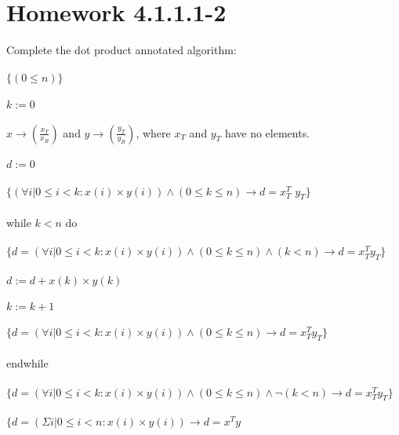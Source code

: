 \documentclass{article}
\begin{document}
\section{Homework 4.1.1.1-2}
Complete the dot product annotated algorithm:
\\
\\
$\lbrace (0 \leq n)\rbrace$
\\
\\
$k := 0$
\\
\\
$ x \rightarrow \left(\frac{x_{T}}{x_{B}}\right)$ and $y \rightarrow \left(\frac{y_{T}}{y_{B}}\right)$, where $x_{T}$ and $y_{T}$ have no elements.
\\
\\
$d := 0$
\\
\\
$\lbrace (\forall i | 0 \leq i < k : x(i) \times y(i)) \land (0 \leq k \leq n) \rightarrow d = x^{T}_{T}$ $y_{T}\rbrace$
\\
\\
while $k < n$ do
\\
\\
$\lbrace d = (\forall i | 0 \leq i < k : x(i) \times y(i)) \land (0 \leq k \leq n) \land (k < n) \rightarrow d = x^{T}_{T}y_{T} \rbrace$
\\
\\
$d := d + x(k) \times y(k)$
\\
\\
$k := k + 1$
\\
\\
$\lbrace d = (\forall i | 0 \leq i < k : x(i) \times y(i)) \land (0 \leq k \leq n) \rightarrow d = x^{T}_{T} y_{T}\rbrace$
\\
\\
endwhile
\\
\\
$\lbrace d = (\forall i | 0 \leq i < k : x(i) \times y(i)) \land (0 \leq k \leq n) \land \neg(k < n) \rightarrow d = x^{T}_{T} y_{T}\rbrace$
\\
\\
$\lbrace d = (\Sigma i | 0 \leq i < n : x(i) \times y(i)) \rightarrow d = x^{T} y$
\end{document}
